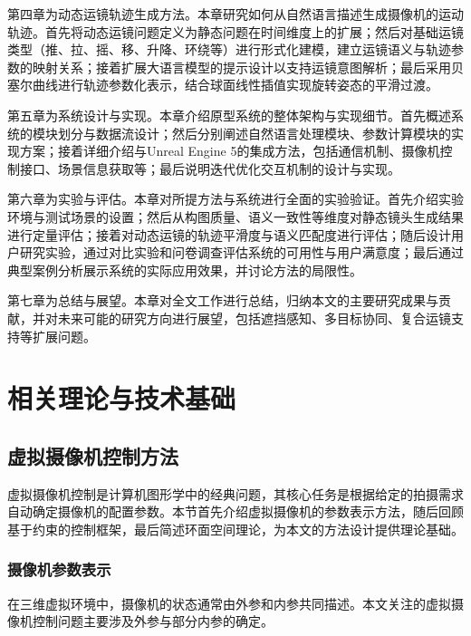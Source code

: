 第四章为动态运镜轨迹生成方法。本章研究如何从自然语言描述生成摄像机的运动轨迹。首先将动态运镜问题定义为静态问题在时间维度上的扩展；然后对基础运镜类型（推、拉、摇、移、升降、环绕等）进行形式化建模，建立运镜语义与轨迹参数的映射关系；接着扩展大语言模型的提示设计以支持运镜意图解析；最后采用贝塞尔曲线进行轨迹参数化表示，结合球面线性插值实现旋转姿态的平滑过渡。

第五章为系统设计与实现。本章介绍原型系统的整体架构与实现细节。首先概述系统的模块划分与数据流设计；然后分别阐述自然语言处理模块、参数计算模块的实现方案；接着详细介绍与Unreal Engine 5的集成方法，包括通信机制、摄像机控制接口、场景信息获取等；最后说明迭代优化交互机制的设计与实现。

第六章为实验与评估。本章对所提方法与系统进行全面的实验验证。首先介绍实验环境与测试场景的设置；然后从构图质量、语义一致性等维度对静态镜头生成结果进行定量评估；接着对动态运镜的轨迹平滑度与语义匹配度进行评估；随后设计用户研究实验，通过对比实验和问卷调查评估系统的可用性与用户满意度；最后通过典型案例分析展示系统的实际应用效果，并讨论方法的局限性。

第七章为总结与展望。本章对全文工作进行总结，归纳本文的主要研究成果与贡献，并对未来可能的研究方向进行展望，包括遮挡感知、多目标协同、复合运镜支持等扩展问题。


\chapter{相关理论与技术基础}
\label{chap:theory}

\section{虚拟摄像机控制方法}

虚拟摄像机控制是计算机图形学中的经典问题，其核心任务是根据给定的拍摄需求自动确定摄像机的配置参数\cite{christie2008camera}。本节首先介绍虚拟摄像机的参数表示方法，随后回顾基于约束的控制框架，最后简述环面空间理论，为本文的方法设计提供理论基础。

\subsection{摄像机参数表示}

在三维虚拟环境中，摄像机的状态通常由外参和内参共同描述\cite{hartley2003multiple}。本文关注的虚拟摄像机控制问题主要涉及外参与部分内参的确定。

